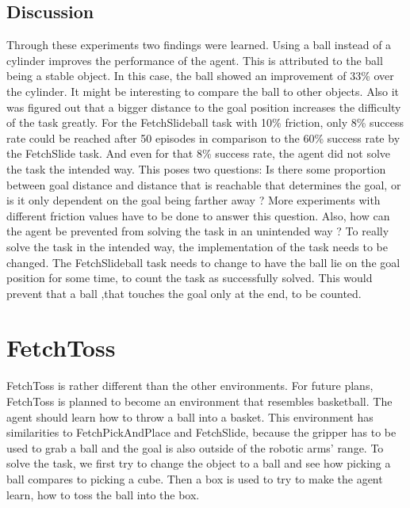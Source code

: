 
\subsection{Discussion}

Through these experiments two findings were learned. Using a ball instead of a cylinder improves the performance of the agent. This is attributed to the ball being a stable object. In this case, the ball showed an improvement of 33\% over the cylinder. It might be interesting to compare the ball to other objects. Also it was figured out that a bigger distance to the goal position increases the difficulty of the task greatly. For the FetchSlideball task with 10\% friction, only 8\% success rate could be reached after 50 episodes in comparison to the 60\% success rate by the FetchSlide task. And even for that 8\% success rate, the agent did not solve the task the intended way. This poses two questions: Is there some proportion between goal distance and distance that is reachable that determines the goal, or is it only dependent on the goal being farther away ? More experiments with different friction values have to be done to answer this question.
Also, how can the agent be prevented from solving the task in an unintended way ? To really solve the task in the intended way, the implementation of the task needs to be changed. The FetchSlideball task needs to change to have the ball lie on the goal position for some time, to count the task as successfully solved. This would prevent that a ball ,that touches the goal only at the end, to be counted.





\section{FetchToss}

FetchToss is rather different than the other environments. For future plans, FetchToss is planned to become an environment that resembles basketball. The agent should learn how to throw a ball into a basket. This environment has similarities to FetchPickAndPlace and FetchSlide, because the gripper has to be used to grab a ball and the goal is also outside of the robotic arms' range. To solve the task, we first try to change the object to a ball and see how picking a ball compares to picking a cube.
Then a box is used to try to make the agent learn, how to toss the ball into the box.


